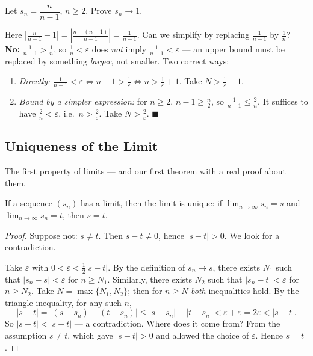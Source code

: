 \documentclass[11pt]{report}
\begin{document}
\begin{exbox}
Let $s_n = \dfrac{n}{n-1}$, $n \geq 2$. Prove $s_n \to 1$.

Here $\left| \tfrac{n}{n-1} - 1 \right| = \left| \tfrac{n - (n-1)}{n-1} \right| = \tfrac{1}{n-1}$. Can we simplify by replacing $\tfrac{1}{n-1}$ by $\tfrac1n$? \textbf{No:} $\tfrac{1}{n-1} > \tfrac1n$, so $\tfrac1n < \varepsilon$ does \emph{not} imply $\tfrac{1}{n-1} < \varepsilon$ --- an upper bound must be replaced by something \emph{larger}, not smaller. Two correct ways:
\begin{enumerate}[label=(\arabic*)]
    \item \emph{Directly:} $\tfrac{1}{n-1} < \varepsilon \iff n - 1 > \tfrac1\varepsilon \iff n > \tfrac1\varepsilon + 1$. Take $N > \tfrac1\varepsilon + 1$.
    \item \emph{Bound by a simpler expression:} for $n \geq 2$, $n - 1 \geq \tfrac{n}{2}$, so $\tfrac{1}{n-1} \leq \tfrac2n$. It suffices to have $\tfrac2n < \varepsilon$, i.e.\ $n > \tfrac2\varepsilon$. Take $N > \tfrac2\varepsilon$. \hfill $\blacksquare$
\end{enumerate}
\end{exbox}

\subsection{Uniqueness of the Limit}

The first property of limits --- and our first theorem with a real proof about them.

\begin{thmbox}
If a sequence $(s_n)$ has a limit, then the limit is unique: if $\lim_{n\to\infty} s_n = s$ and $\lim_{n\to\infty} s_n = t$, then $s = t$.
\end{thmbox}

\begin{proof}
Suppose not: $s \neq t$. Then $s - t \neq 0$, hence $|s - t| > 0$. We look for a contradiction.

Take $\varepsilon$ with $0 < \varepsilon < \tfrac12 |s - t|$. By the definition of $s_n \to s$, there exists $N_1$ such that $|s_n - s| < \varepsilon$ for $n \geq N_1$. Similarly, there exists $N_2$ such that $|s_n - t| < \varepsilon$ for $n \geq N_2$. Take $N = \max\{N_1, N_2\}$; then for $n \geq N$ \emph{both} inequalities hold. By the triangle inequality, for any such $n$,
\[
|s - t| = |(s - s_n) - (t - s_n)| \leq |s - s_n| + |t - s_n| < \varepsilon + \varepsilon = 2\varepsilon < |s - t|.
\]
So $|s - t| < |s - t|$ --- a contradiction. Where does it come from? From the assumption $s \neq t$, which gave $|s-t| > 0$ and allowed the choice of $\varepsilon$. Hence $s = t$.
\end{proof}
\end{document}
